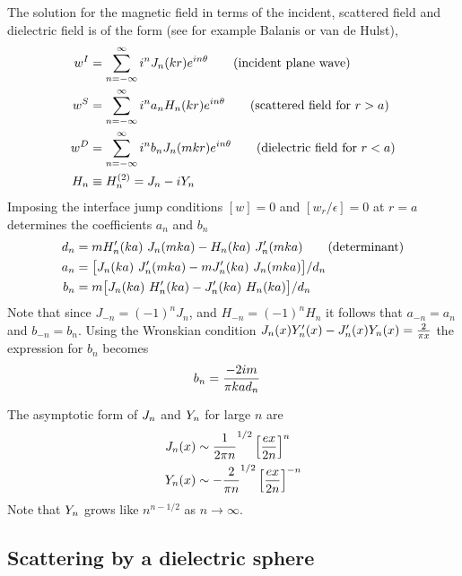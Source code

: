 \documentclass[10pt]{article}
\begin{document}
The solution for the magnetic field
in terms of the incident, scattered field and dielectric field is of the form (see for example
Balanis\cite{Balanis89} or van de Hulst\cite{vanDeHulst57}), 
\begin{align*}
    w^I &= \sum_{n=-\infty}^\infty i^n J_n(kr) e^{i n \theta}  \qquad\mbox{(incident plane wave)} \\ 
    w^S &= \sum_{n=-\infty}^\infty i^n a_n H_n(kr) e^{i n \theta}  \qquad\mbox{(scattered field for $r>a$)} \\ 
    w^D &= \sum_{n=-\infty}^\infty i^n b_n J_n(m k r) e^{i n \theta}  \qquad\mbox{(dielectric field for $r<a$)} \\
    H_n &\equiv H_n^{(2)} = J_n - i Y_n \\
\end{align*}
Imposing the interface jump conditions $[w]=0$ and $[w_r/\epsilon]=0$ at $r=a$ determines the coefficients
$a_n$ and $b_n$
\begin{align*}
    d_n &= m H_n'(ka)~J_n(mka) - H_n(ka)~J_n'(mka) \qquad\mbox{(determinant)}\\
   a_n &= \big[ J_n(ka)~J_n'(mka) - m J_n'(ka)~J_n(mka) \big]/d_n \\
   b_n &= m \big[ J_n(ka)~H_n'(ka) - J_n'(ka)~H_n(ka) \big]/d_n
\end{align*}
Note that since $J_{-n}=(-1)^n J_n$, and $H_{-n}=(-1)^n H_n$ it follows that $a_{-n}=a_n$ and $b_{-n}=b_n$.
Using the Wronskian condition $J_n(x) Y_n'(x) - J_n'(x) Y_n(x) = {2\over \pi x}$ the expression
for $b_n$ becomes
\begin{align*}
   b_n &= {-2 i m \over \pi k a d_n }
\end{align*}

The asymptotic form of $J_n$ and $Y_n$ for large $n$ are
\begin{align*}
   J_n(x) & \sim  {1\over 2\pi n}^{1/2}\left[ e x \over 2 n \right]^n \\
   Y_n(x) & \sim  - {2\over \pi n}^{1/2}\left[ e x \over 2 n \right]^{-n}
\end{align*}
Note that $Y_n$ grows like $n^{n-1/2}$ as $n\rightarrow\infty$.


\clearpage
\subsection{Scattering by a dielectric sphere}



\newcommand{\cc}{\tilde{c}}
\clearpage
\end{document}
